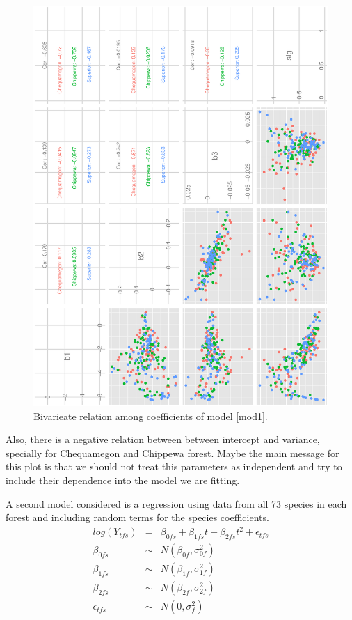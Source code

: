 \documentclass{article}
\begin{document}
\begin{figure}[h!]
\centering
\includegraphics[scale=.6, angle=-90]{scat_m1.ps}
\caption{Bivarieate relation among coefficients of model \ref{mod1}. \label{pairs1}}
\end{figure}
Also, there is a negative relation between between intercept and variance, specially for Chequamegon and Chippewa forest. Maybe the main message for this plot is that we should not treat this parameters as independent and try to include their dependence into the model we are fitting. 


A second model considered is a regression using data from all 73 species in each forest and including random terms for the species coefficients. 
\begin{eqnarray}
\nonumber log(Y_{tfs}) &=&  \beta_{0fs} + \beta_{1fs}t + \beta_{2fs}t^2 + \epsilon_{tfs}  \\
\nonumber \beta_{0fs} &\sim& N(\beta_{0f}, \sigma_{0f}^2 ) \\ 
\nonumber \beta_{1fs} &\sim& N(\beta_{1f}, \sigma_{1f}^2 ) \\ 
\nonumber \beta_{2fs} &\sim& N(\beta_{2f}, \sigma_{2f}^2 ) \\ 
\epsilon_{tfs} &\sim& N(0,\sigma_f^2)
\label{mod2}
\end{eqnarray}
\end{document}
